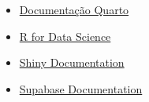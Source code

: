 \documentclass[
  letterpaper,
]{book}
\providecommand{\tightlist}{%
  \setlength{\itemsep}{0pt}\setlength{\parskip}{0pt}}\usepackage{longtable,booktabs,array}
\begin{document}

\begin{itemize}
\tightlist
\item
  \href{https://quarto.org/}{Documentação Quarto}
\item
  \href{https://r4ds.hadley.nz/}{R for Data Science}
\item
  \href{https://shiny.posit.co/}{Shiny Documentation}
\item
  \href{https://supabase.com/docs}{Supabase Documentation}
\end{itemize}


\backmatter
\end{document}
